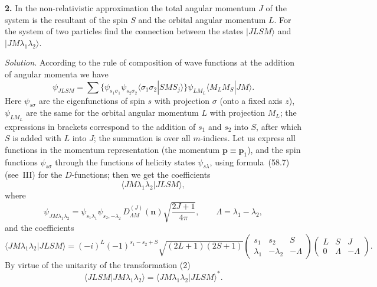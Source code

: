 \textbf{2.} In the non-relativistic approximation the total angular momentum $J$ of the system is the resultant of the spin $S$ and the orbital angular momentum $L$. For the system of two particles find the connection between the states $|JLSM\rangle$ and $|JM\lambda_1\lambda_2\rangle$.

\textit{Solution.} According to the rule of composition of wave functions at the addition of angular momenta we have
\[
\psi_{JLSM} = \sum\{\psi_{s_1\sigma_1}\psi_{s_2\sigma_2}\langle\sigma_1\sigma_2|SMS_j\rangle\}\psi_{LM_L}\langle M_L M_S|JM\rangle.\tag{1}
\]
Here $\psi_{s\sigma}$ are the eigenfunctions of spin $s$ with projection $\sigma$ (onto a fixed axis $z$), $\psi_{LM_L}$ are the same for the orbital angular momentum $L$ with projection $M_L$; the expressions in brackets correspond to the addition of $s_1$ and $s_2$ into $S$, after which $S$ is added with $L$ into $J$; the summation is over all $m$-indices. Let us express all functions in the momentum representation (the momentum $\mathbf{p} \equiv \mathbf{p}_1$), and the spin functions $\psi_{s\sigma}$ through the functions of helicity states $\psi_{s\lambda}$, using formula~(58.7) (see~III) for the $D$-functions; then we get the coefficients
\[
\langle JM\lambda_1\lambda_2|JLSM\rangle,\tag{3}
\]
where
\[
\psi_{JM\lambda_1\lambda_2} = \psi_{s_1\lambda_1}\psi_{s_2,-\lambda_2}\,D^{(J)}_{\Lambda M}(\mathbf{n})\sqrt{\frac{2J+1}{4\pi}},\qquad \Lambda = \lambda_1 - \lambda_2,
\]
and the coefficients
\[
\langle JM\lambda_1\lambda_2|JLSM\rangle =
(-i)^L(-1)^{s_1 - s_2 + S}\sqrt{(2L+1)(2S+1)}\begin{pmatrix}s_1 & s_2 & S\\ \lambda_1 & -\lambda_2 & -\Lambda\end{pmatrix}\begin{pmatrix}L & S & J\\ 0 & \Lambda & -\Lambda\end{pmatrix}.\tag{3}
\]
By virtue of the unitarity of the transformation (2)
\[
\langle JLSM|JM\lambda_1\lambda_2\rangle = \langle JM\lambda_1\lambda_2|JLSM\rangle^*.
\]
